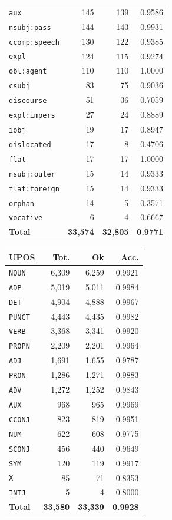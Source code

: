 \begin{table}[ht]
\begin{minipage}[t]{0.55\linewidth}
\begin{tabular}{lrrr}
\texttt{aux} & 145 & 139 & 0.9586 \\
\texttt{nsubj\!:\!pass} & 144 & 143 & 0.9931 \\
\texttt{ccomp\!:\!speech} & 130 & 122 & 0.9385 \\
\texttt{expl} & 124 & 115 & 0.9274 \\
\texttt{obl\!:\!agent} & 110 & 110 & 1.0000 \\
\texttt{csubj} & 83 & 75 & 0.9036 \\
\texttt{discourse} & 51 & 36 & 0.7059 \\
\texttt{expl\!:\!impers} & 27 & 24 & 0.8889 \\
\texttt{iobj} & 19 & 17 & 0.8947 \\
\texttt{dislocated} & 17 & 8 & 0.4706 \\
\texttt{flat} & 17 & 17 & 1.0000 \\
\texttt{nsubj\!:\!outer} & 15 & 14 & 0.9333 \\
\texttt{flat\!:\!foreign} & 15 & 14 & 0.9333 \\
\texttt{orphan} & 14 & 5 & 0.3571 \\
\texttt{vocative} & 6 & 4 & 0.6667 \\
\midrule
\textbf{Total} & \textbf{33,574} & \textbf{32,805} & \textbf{0.9771} \\
\bottomrule
\end{tabular}
\end{minipage}
\hfill
\begin{minipage}[t]{0.42\linewidth}
\centering\scriptsize
\begin{tabular}{lrrr}
\toprule
\textbf{UPOS} & \textbf{Tot.} & \textbf{Ok} & \textbf{Acc.} \\
\midrule
\texttt{NOUN} & 6,309 & 6,259 & 0.9921 \\
\texttt{ADP} & 5,019 & 5,011 & 0.9984 \\
\texttt{DET} & 4,904 & 4,888 & 0.9967 \\
\texttt{PUNCT} & 4,443 & 4,435 & 0.9982 \\
\texttt{VERB} & 3,368 & 3,341 & 0.9920 \\
\texttt{PROPN} & 2,209 & 2,201 & 0.9964 \\
\texttt{ADJ} & 1,691 & 1,655 & 0.9787 \\
\texttt{PRON} & 1,286 & 1,271 & 0.9883 \\
\texttt{ADV} & 1,272 & 1,252 & 0.9843 \\
\texttt{AUX} & 968 & 965 & 0.9969 \\
\texttt{CCONJ} & 823 & 819 & 0.9951 \\
\texttt{NUM} & 622 & 608 & 0.9775 \\
\texttt{SCONJ} & 456 & 440 & 0.9649 \\
\texttt{SYM} & 120 & 119 & 0.9917 \\
\texttt{X} & 85 & 71 & 0.8353 \\
\texttt{INTJ} & 5 & 4 & 0.8000 \\
\midrule
\textbf{Total} & \textbf{33,580} & \textbf{33,339} & \textbf{0.9928} \\
\bottomrule
\end{tabular}
\end{minipage}
\end{table}
